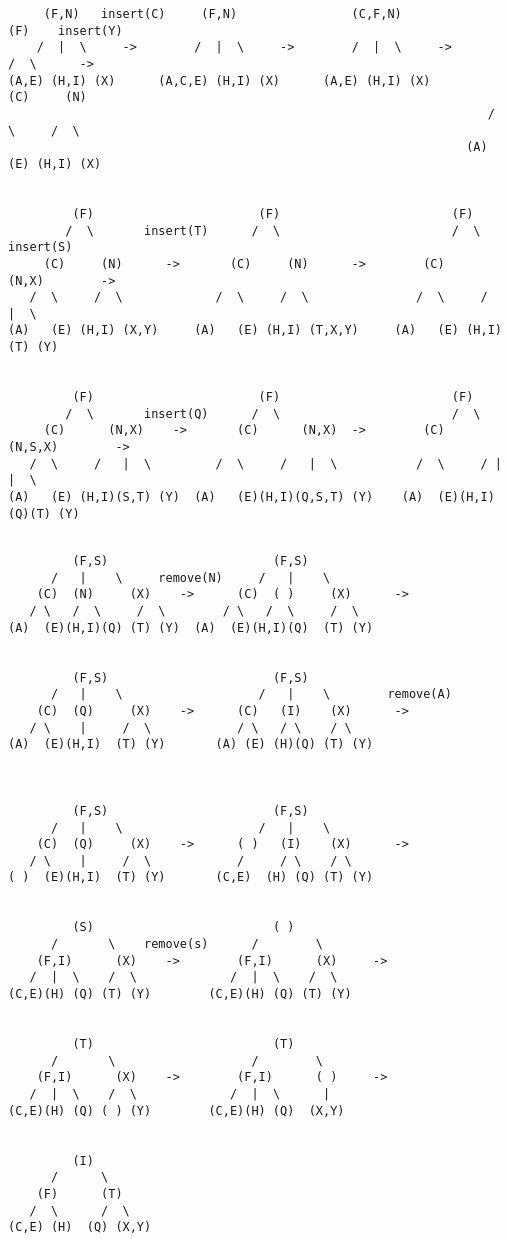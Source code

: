 \documentclass[a4paper]{article}
\begin{document}
\begin{verbatim}
     (F,N)   insert(C)     (F,N)                (C,F,N)                  (F)    insert(Y)
    /  |  \     ->        /  |  \     ->        /  |  \     ->          /  \      ->
(A,E) (H,I) (X)      (A,C,E) (H,I) (X)      (A,E) (H,I) (X)         (C)     (N)
                                                                   /  \     /  \
                                                                (A)   (E) (H,I) (X)


         (F)                       (F)                        (F)           
        /  \       insert(T)      /  \                        /  \            insert(S)
     (C)     (N)      ->       (C)     (N)      ->        (C)      (N,X)        ->
   /  \     /  \             /  \     /  \               /  \     /   |  \  
(A)   (E) (H,I) (X,Y)     (A)   (E) (H,I) (T,X,Y)     (A)   (E) (H,I) (T) (Y)


         (F)                       (F)                        (F)           
        /  \       insert(Q)      /  \                        /  \             
     (C)      (N,X)    ->       (C)      (N,X)  ->        (C)      (N,S,X)        ->
   /  \     /   |  \         /  \     /   |  \           /  \     / |  |  \  
(A)   (E) (H,I)(S,T) (Y)  (A)   (E)(H,I)(Q,S,T) (Y)    (A)  (E)(H,I)(Q)(T) (Y)
\end{verbatim}
\break
\begin{verbatim}
         
         (F,S)                       (F,S)              
      /   |    \     remove(N)     /   |    \             
    (C)  (N)     (X)    ->      (C)  ( )     (X)      ->
   / \   /  \     /  \        / \   /  \     /  \ 
(A)  (E)(H,I)(Q) (T) (Y)  (A)  (E)(H,I)(Q)  (T) (Y)


         (F,S)                       (F,S)              
      /   |    \                   /   |    \        remove(A)
    (C)  (Q)     (X)    ->      (C)   (I)    (X)      ->
   / \    |     /  \            / \   / \    / \ 
(A)  (E)(H,I)  (T) (Y)       (A) (E) (H)(Q) (T) (Y)



         (F,S)                       (F,S)              
      /   |    \                   /   |    \             
    (C)  (Q)     (X)    ->      ( )   (I)    (X)      ->
   / \    |     /  \            /     / \    / \ 
( )  (E)(H,I)  (T) (Y)       (C,E)  (H) (Q) (T) (Y)


         (S)                         ( )              
      /       \    remove(s)      /        \             
    (F,I)      (X)    ->        (F,I)      (X)     ->
   /  |  \    /  \             /  |  \    /  \  
(C,E)(H) (Q) (T) (Y)        (C,E)(H) (Q) (T) (Y)


         (T)                         (T)              
      /       \                   /        \             
    (F,I)      (X)    ->        (F,I)      ( )     ->
   /  |  \    /  \             /  |  \      |  
(C,E)(H) (Q) ( ) (Y)        (C,E)(H) (Q)  (X,Y)


         (I)              
      /      \             
    (F)      (T)     
   /  \      /  \ 
(C,E) (H)  (Q) (X,Y)

\end{verbatim}
\end{document}
